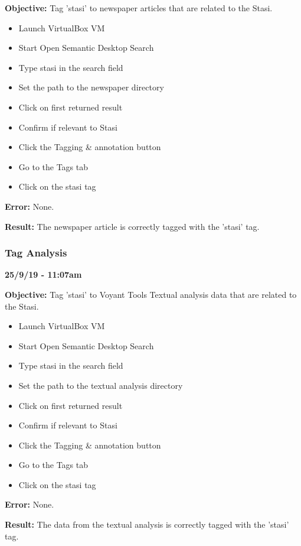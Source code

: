 \documentclass{article}
\begin{document}
\textbf{Objective:} Tag 'stasi' to newspaper articles that are related to the Stasi.

\begin{itemize}
    \item Launch VirtualBox VM
    \item Start Open Semantic Desktop Search
    \item Type stasi in the search field
    \item Set the path to the newspaper directory
    \item Click on first returned result
    \item Confirm if relevant to Stasi
    \item Click the Tagging \& annotation button
    \item Go to the Tags tab
    \item Click on the stasi tag
\end{itemize}

\textbf{Error:} None.

\textbf{Result:} The newspaper article is correctly tagged with the 'stasi' tag.

\subsubsection{Tag Analysis}

\textbf{25/9/19 - 11:07am}

\textbf{Objective:} Tag 'stasi' to Voyant Tools Textual analysis data that are related to the Stasi.

\begin{itemize}
    \item Launch VirtualBox VM
    \item Start Open Semantic Desktop Search
    \item Type stasi in the search field
    \item Set the path to the textual analysis directory
    \item Click on first returned result
    \item Confirm if relevant to Stasi
    \item Click the Tagging \& annotation button
    \item Go to the Tags tab
    \item Click on the stasi tag
\end{itemize}

\textbf{Error:} None.

\textbf{Result:} The data from the textual analysis is correctly tagged with the 'stasi' tag.
\end{document}
